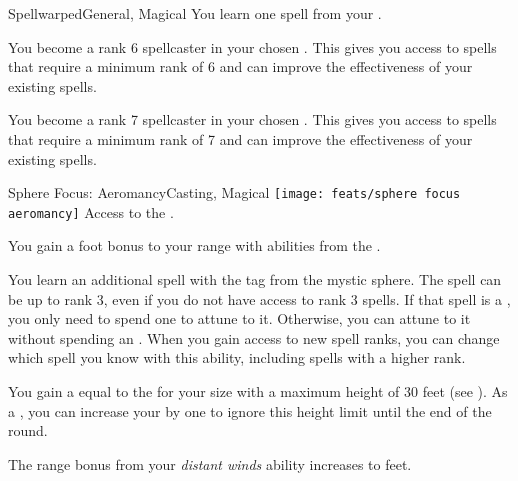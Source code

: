 \begin{magicalfeat}{Spellwarped}{General, Magical}
         You learn one spell from your .

         You become a rank 6 spellcaster in your chosen .
        This gives you access to spells that require a minimum rank of 6 and can improve the effectiveness of your existing spells.

         You become a rank 7 spellcaster in your chosen .
        This gives you access to spells that require a minimum rank of 7 and can improve the effectiveness of your existing spells.
    \end{magicalfeat}

    \begin{magicalfeat}{Sphere Focus: Aeromancy}{Casting, Magical}
        \texttt{[image: feats/sphere focus aeromancy]}
        \featpre Access to the  .

         You gain a  foot bonus to your range with abilities from the  .

         You learn an additional spell with the  tag from the  mystic sphere.
        The spell can be up to rank 3, even if you do not have access to rank 3 spells.
        If that spell is a , you only need to spend one  to attune to it.
        Otherwise, you can attune to it without spending an .
        When you gain access to new spell ranks, you can change which spell you know with this ability, including spells with a higher rank.

         You gain a  equal to the  for your size with a maximum height of 30 feet (see ).
        As a , you can increase your  by one to ignore this height limit until the end of the round.

         The range bonus from your \textit{distant winds} ability increases to  feet.
    \end{magicalfeat}

